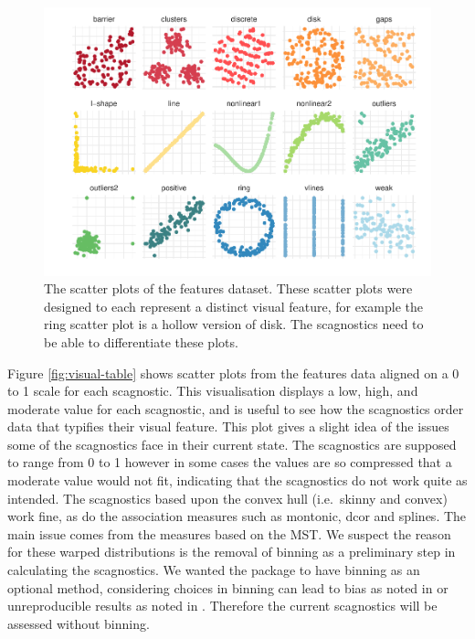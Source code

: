 \begin{Schunk}
\begin{figure}
\includegraphics[width=1\linewidth]{mason-lee-laa-cook_files/figure-latex/features-plot-1} \caption[The scatter plots of the features dataset]{The scatter plots of the features dataset. These scatter plots were designed to each represent a distinct visual feature, for example the ring scatter plot is a hollow version of disk. The scagnostics need to be able to differentiate these plots.}\label{fig:features-plot}
\end{figure}
\end{Schunk}

Figure \ref{fig:visual-table} shows scatter plots from the features data
aligned on a 0 to 1 scale for each scagnostic. This visualisation
displays a low, high, and moderate value for each scagnostic, and is
useful to see how the scagnostics order data that typifies their visual
feature. This plot gives a slight idea of the issues some of the
scagnostics face in their current state. The scagnostics are supposed to
range from 0 to 1 however in some cases the values are so compressed
that a moderate value would not fit, indicating that the scagnostics do
not work quite as intended. The scagnostics based upon the convex hull
(i.e.~skinny and convex) work fine, as do the association measures such
as montonic, dcor and splines. The main issue comes from the measures
based on the MST. We suspect the reason for these warped distributions
is the removal of binning as a preliminary step in calculating the
scagnostics. We wanted the package to have binning as an optional
method, considering choices in binning can lead to bias as noted in
\citet{scagdist} or unreproducible results as noted in \citet{robust}.
Therefore the current scagnostics will be assessed without binning.

